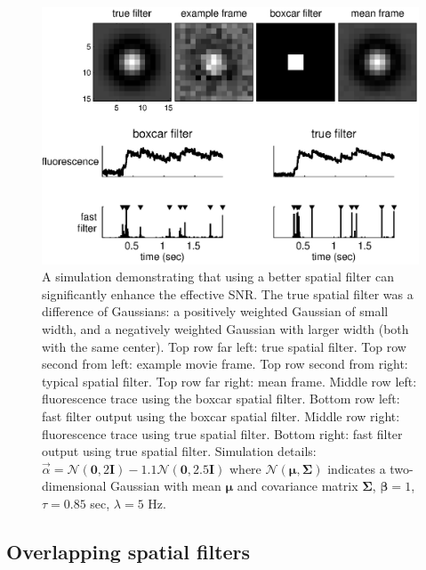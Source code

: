 \documentclass{article}
\providecommand{\ve}[1]{\boldsymbol{#1}}
\newcommand{\bI}{\ve{I}}
\newcommand{\mN}{\mathcal{N}}
\newcommand{\Sig}{\Sigma}
\newcommand{\lam}{\lambda}
\newcommand{\bbeta}{\ve{\beta}}
\newcommand{\valpha}{\vec{\alpha}}
\newcommand{\foopsi}{fast }
\begin{document}
\begin{figure}[h!]
\centering \includegraphics[width=.9\linewidth]{spatial2}
\caption[spatial filtering can improve effective SNR]{A simulation demonstrating that using a better spatial filter can significantly enhance the effective SNR. The true spatial filter was a difference of Gaussians: a positively weighted Gaussian of small width, and a negatively weighted Gaussian with larger width (both with the same center).  Top row far left: true spatial filter.  Top row second from left: example movie frame. Top row second from right: typical spatial filter.   Top row far right: mean frame.  Middle row left: fluorescence trace using the boxcar spatial filter. Bottom row left: \foopsi filter output using the boxcar spatial filter.  Middle row right: fluorescence trace using true spatial filter.  Bottom right: \foopsi filter output using true spatial filter. Simulation details: $\valpha=\mN(\ve{0},2 \bI)-1.1 \mN(\ve{0},2.5 \bI)$ where $\mN(\ve{\mu},\ve{\Sig})$ indicates a two-dimensional Gaussian with mean $\ve{\mu}$ and covariance matrix $\ve{\Sig}$, $\bbeta=1$, $\tau=0.85$ sec, $\lam=5$ Hz.} \label{fig:spatial} 
\end{figure}



\subsection{Overlapping spatial filters} \label{sec:results:overlapping}
\end{document}
